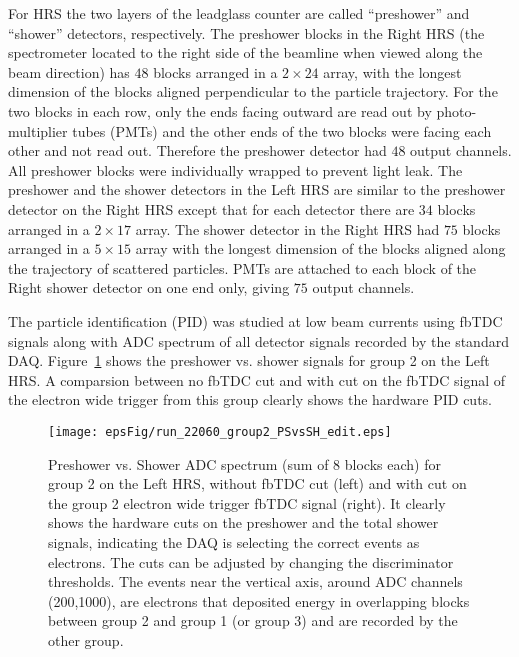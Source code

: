 For HRS the two layers of the leadglass counter are 
called ``preshower'' and ``shower'' detectors, 
respectively. The preshower blocks in the Right HRS 
(the spectrometer located to the right 
side of the beamline when viewed along the beam direction) 
has $48$ blocks arranged in a $2\times 24$ 
array, with the longest dimension of the 
blocks aligned perpendicular to the particle trajectory. For the two blocks
in each row, only the ends facing outward are read 
out by photo-multiplier tubes (PMTs) and 
the other ends of the two blocks were facing each other 
and not read out. Therefore the 
preshower detector had $48$ output channels. All preshower 
blocks were individually wrapped 
to prevent light leak. The preshower and the shower detectors 
in the Left HRS are similar to 
the preshower detector on the Right HRS except that for each 
detector there are $34$ blocks 
arranged in a $2\times 17$ array. The shower detector in the 
Right HRS had $75$ blocks 
arranged in a $5\times 15$ array with the longest dimension 
of the blocks aligned along the trajectory of 
scattered particles. PMTs are attached to each block of 
the Right shower detector on one end only, 
giving $75$ output channels.

The particle identification (PID) was studied at 
low beam currents using 
fbTDC signals along with ADC spectrum
of all detector signals recorded by the standard DAQ. 
Figure~\ref{fig:showerspectrum} shows the preshower vs. shower
signals for group 2 on the Left HRS. A comparsion between no fbTDC cut and with 
cut on the fbTDC signal of the electron wide trigger from this group clearly shows the 
hardware PID cuts.
%
\begin{figure}[!ht]
\hspace*{0.8cm}
\texttt{[image: epsFig/run\_22060\_group2\_PSvsSH\_edit.eps]}
\hspace*{-0.2cm}
\caption{Preshower vs. Shower ADC spectrum (sum of 8 blocks each) for group 2 on the Left HRS,
without fbTDC cut (left) and with cut on the group 2 electron wide trigger fbTDC
signal (right). It clearly shows the hardware cuts on the preshower and the total
shower signals, indicating the DAQ is selecting the correct events
as electrons. The cuts can be adjusted by changing the discriminator 
thresholds.
The events near the vertical axis, around ADC channels (200,1000), 
are electrons that deposited energy in overlapping blocks between group 2 and group 1 
(or group 3) and are recorded by the other group.
}
\label{fig:showerspectrum}
\end{figure}


